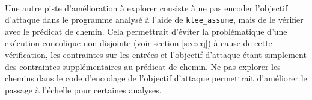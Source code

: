             \paragraph{}
            Une autre piste d'amélioration à explorer consiste à ne pas encoder l'objectif d'attaque dans le programme analysé à l'aide de \texttt{klee\_assume}, mais de le vérifier avec le prédicat de chemin.
            Cela permettrait d'éviter la problématique d'une exécution concolique non disjointe (voir section \ref{sec:eq}) à cause de cette vérification, les contraintes sur les entrées et l'objectif d'attaque étant simplement des contraintes supplémentaires au prédicat de chemin. Ne pas explorer les chemins dans le code d'encodage de l'objectif d'attaque permettrait d'améliorer le passage à l'échelle pour certaines analyses.